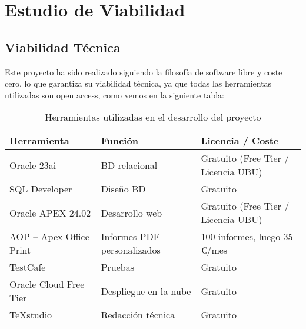 \section{Estudio de Viabilidad}

\subsection{Viabilidad Técnica}
Este proyecto ha sido realizado siguiendo la filosofía de software libre y coste cero, lo que garantiza su viabilidad técnica, ya que todas las herramientas utilizadas son open access, como vemos en la siguiente tabla:

\begin{table}[ht]
	\centering
	\begin{tabular}{|p{3cm}|p{4cm}|p{4cm}|}
		\hline
		\rowcolor{gray!20}
		\textbf{Herramienta} & \textbf{Función} & \textbf{Licencia / Coste} \\
		\hline
		Oracle 23ai & BD relacional & Gratuito (Free Tier / Licencia UBU) \\
		\hline
		SQL Developer & Diseño BD & Gratuito \\
		\hline
		Oracle APEX 24.02 & Desarrollo web & Gratuito (Free Tier / Licencia UBU) \\
		\hline
		AOP – Apex Office Print & Informes PDF personalizados & 100 informes, luego 35 €/mes \\
		\hline
		TestCafe & Pruebas & Gratuito \\
		\hline
		Oracle Cloud Free Tier & Despliegue en la nube & Gratuito \\
		\hline
		TeXstudio & Redacción técnica & Gratuito \\
		\hline
	\end{tabular}
	\caption{Herramientas utilizadas en el desarrollo del proyecto}
\end{table}
